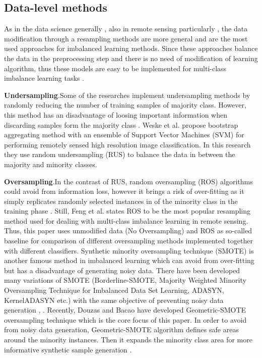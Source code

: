 \documentclass[parskip=full]{scrartcl}
\begin{document}
\subsection{Data-level methods}
As in the data science generally \cite{douzas2019geometric}, also in remote
sensing particularly  \cite{feng2019imbalanced}, the data modification through
a resampling methods are more general and are the most used approaches for
imbalanced learning methods. Since these approaches balance the data in the
preprocessing step and there is no need of modification of learning algorithm,
thus these models are easy to be implemented for multi-class imbalance learning
tasks  \cite{feng2019imbalanced}. 

\textbf{Undersampling}.Some of the researches implement undersampling methods by
randomly reducing the number of training samples of majority class. However,
this method has an disadvantage of loosing important information when discarding
samples form the majority class \cite{feng2019imbalanced}.  Weske et al.
\cite{waske2009classifying} propose bootstrap aggregating method with an
ensemble of Support Vector Machines (SVM) for performing remotely sensed high
resolution image classification. In this research they use random undersampling
(RUS) to balance the data in between the majority and minority classes.

\textbf{Oversampling}.In the contrast of RUS, random oversampling (ROS)
algorithms could avoid from information loss, however it brings a risk of
over-fitting as it simply replicates randomly selected instances in of the
minority class in the training phase \cite{douzas2019geometric}. Still, Feng et
al. \cite{feng2019imbalanced} states ROS to be the most popular resampling
method used for dealing with multi-class imbalance learning in remote sensing.
Thus, this paper uses unmodified data (No Oversampling) and ROS as so-called
baseline for comparison of different oversampling methods implemented together
with different classifiers. Synthetic minority oversampling technique (SMOTE) is
another famous method in imbalanced learning which can avoid from over-fitting
but has a disadvantage of generating noisy data. There have been developed many
variations of SMOTE (Borderline-SMOTE, Majority Weighted Minority Oversampling
Technique for Imbalanced Data Set Learning, ADASYN, KernelADASYN etc.) with the
same objective of preventing noisy data generation \cite{douzas2019geometric},
\cite{feng2019imbalanced}. Recently, Douzas and Bacao have developed
Geometric-SMOTE oversampling technique which is the core focus of this paper. In
order to avoid from noisy data generation, Geometric-SMOTE algorithm defines
safe areas around the minority instances. Then it expands the minority class
area for more informative synthetic sample generation
\cite{douzas2019geometric}. 
\end{document}
